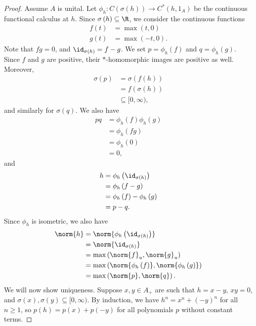 \documentclass[10pt]{mypackage}
\begin{document}
\begin{proof}
  Assume $A$ is unital. Let $\phi_h\colon C\left(\sigma\left(h\right)\right)\rightarrow C^{\ast}\left(h,1_A\right)$ be the continuous functional calculus at $h$. Since $\sigma\left(h\right)\subseteq \R$, we consider the continuous functions
  \begin{align*}
    f(t) &= \max\left(t,0\right)\\
    g(t) &= \max\left(-t,0\right).
  \end{align*}
  Note that $fg = 0$, and $\id_{\sigma\left(h\right)} = f-g$. We set $p = \phi_h\left(f\right)$ and $q = \phi_h\left(g\right)$. Since $f$ and $g$ are positive, their $\ast$-homomorphic images are positive as well. Moreover,
  \begin{align*}
    \sigma\left(p\right) &= \sigma\left(f\left(h\right)\right)\\
                         &= f\left(\sigma\left(h\right)\right)\\
                         &\subseteq [0,\infty),
  \end{align*}
  and similarly for $\sigma\left(q\right)$. We also have
  \begin{align*}
    pq &= \phi_h\left(f\right)\phi_h\left(g\right)\\
       &= \phi_h\left(fg\right)\\
       &= \phi_h\left(0\right)\\
       &= 0,
  \end{align*}
  and
  \begin{align*}
    h &= \phi_h\left(\id_{\sigma\left(h\right)}\right)\\
      &= \phi_h\left(f-g\right)\\
      &= \phi_h\left(f\right) - \phi_h\left(g\right)\\
      &= p-q.
  \end{align*}
  Since $\phi_h$ is isometric, we also have
  \begin{align*}
    \norm{h} &= \norm{\phi_h\left(\id_{\sigma\left(h\right)}\right)}\\
             &= \norm{\id_{\sigma\left(h\right)}}\\
             &= \max\left(\norm{f}_u,\norm{g}_u\right)\\
             &= \max\left(\norm{\phi_h\left(f\right)},\norm{\phi_h\left(g\right)}\right)\\
             &= \max\left(\norm{p},\norm{q}\right). 
  \end{align*}
  We will now show uniqueness. Suppose $x,y\in A_+$ are such that $h=x-y$, $xy = 0$, and $\sigma\left(x\right),\sigma\left(y\right)\subseteq [0,\infty)$. By induction, we have $h^n = x^n + \left(-y\right)^n$ for all $n\geq 1$, so $p\left(h\right) = p\left(x\right) + p\left(-y\right)$ for all polynomials $p$ without constant terms.\newline


\end{proof}
\end{document}
